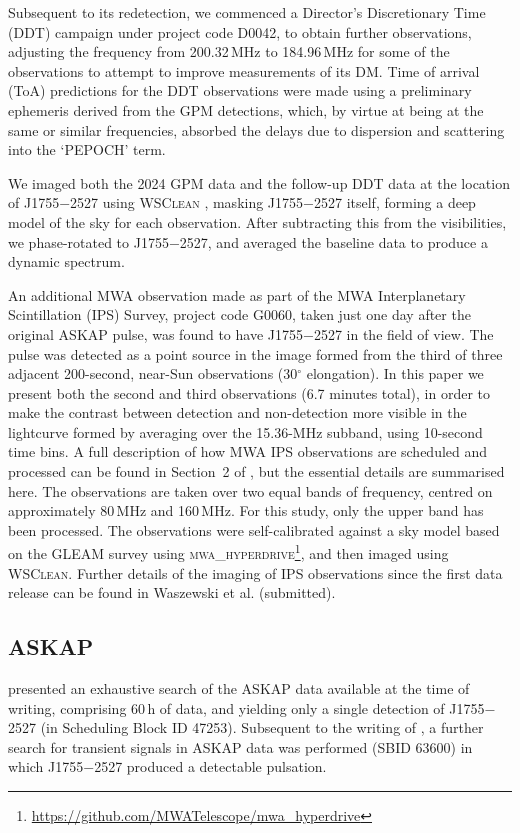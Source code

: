 \documentclass[fleqn,usenatbib]{mnras}
\newcommand{\src}{J1755$-$2527}
\begin{document}
Subsequent to its redetection, we commenced a Director's Discretionary Time (DDT) campaign under project code D0042, to obtain further observations, adjusting the frequency from 200.32\,MHz to 184.96\,MHz for some of the observations to attempt to improve measurements of its DM.
Time of arrival (ToA) predictions for the DDT observations were made using a preliminary ephemeris derived from the GPM detections, which, by virtue at being at the same or similar frequencies, absorbed the delays due to dispersion and scattering into the `PEPOCH' term.

We imaged both the 2024 GPM data and the follow-up DDT data at the location of \src{} using \textsc{WSClean} \citep{2014MNRAS.444..606O}, masking \src{} itself, forming a deep model of the sky for each observation. After subtracting this from the visibilities, we phase-rotated to \src{}, and averaged the baseline data to produce a dynamic spectrum.

An additional MWA observation made as part of the MWA Interplanetary Scintillation (IPS) Survey, project code G0060, taken just one day after the original ASKAP pulse, was found to have \src{} in the field of view.
The pulse was detected as a point source in the image formed from the third of three adjacent 200-second, near-Sun observations (30$^{\circ}$ elongation).
In this paper we present both the second and third observations (6.7 minutes total), in order to make the contrast between detection and non-detection more visible in the lightcurve formed by averaging over the 15.36-MHz subband, using 10-second time bins.
A full description of how MWA IPS observations are scheduled and processed can be found in Section~2 of \citet{Morgan2022}, but the essential details are summarised here.
The observations are taken over two equal bands of frequency, centred on approximately 80\,MHz and 160\,MHz.
For this study, only the upper band has been processed. 
The observations were self-calibrated against a sky model based on the GLEAM survey \citep{Hurley-Walker2017} using \textsc{mwa\_hyperdrive}\footnote{\url{https://github.com/MWATelescope/mwa_hyperdrive}}, and then imaged using \textsc{WSClean}.
Further details of the imaging of IPS observations since the first data release can be found in Waszewski et al. (submitted).

\subsection{ASKAP} \label{sec:askap}

 presented an exhaustive search of the ASKAP data available at the time of writing, comprising 60\,h of data, and yielding only a single detection of \src{} (in Scheduling Block ID 47253). Subsequent to the writing of , a further search for transient signals in ASKAP data was performed (SBID 63600) in which \src{} produced a detectable pulsation.
\end{document}
